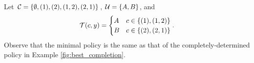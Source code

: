 \begin{example}
Let $\mathcal{C}=\{\emptyset, (1), (2), (1,2), (2,1)\}$, $\mathcal{U}=\{A,B\}$, and
\begin{equation*}
\mathcal{T}(c,y) = \begin{cases}
A & c\in\{(1), (1,2)\}\\
B & c\in\{(2), (2,1)\}
\end{cases}.
\end{equation*}
Observe that the minimal policy is the same as that of the completely-determined policy in Example \ref{fig:best_completion}.
\setcounter{subfigure}{0}
\begin{figure}[h]
\begin{floatrow}
\qquad
{}
\end{floatrow}
\setcounter{figure}{\value{example}}
\label{fig:incomplete}
\end{figure}
\end{example}
